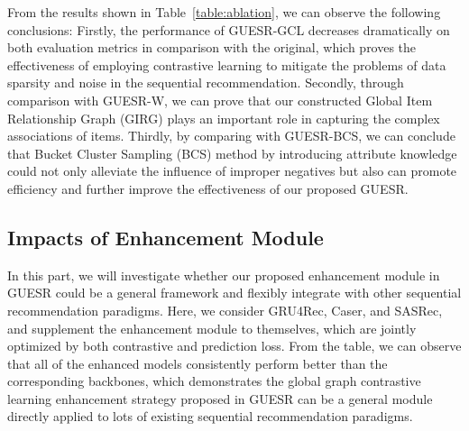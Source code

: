 \documentclass[runningheads]{llncs}
\begin{document}
From the results shown in Table~\ref{table:ablation}, we can observe the following conclusions: 
Firstly, the performance of GUESR-GCL decreases dramatically on both evaluation metrics in comparison with the original, which proves the effectiveness of employing contrastive learning to mitigate the problems of data sparsity and noise in the sequential recommendation.
Secondly, through comparison with GUESR-W, we can prove that our constructed Global Item Relationship Graph (GIRG) plays an important role in capturing the complex associations of items. 
Thirdly, by comparing with GUESR-BCS, we can conclude that Bucket Cluster Sampling (BCS) method by introducing attribute knowledge could not only alleviate the influence of improper negatives but also can promote efficiency and further improve the effectiveness of our proposed GUESR. 

\vspace{-15pt}

\subsection{Impacts of Enhancement Module}
\vspace{-5pt}
In this part, we will investigate whether our proposed enhancement module in GUESR could be a general framework and flexibly integrate with other sequential recommendation paradigms. Here, we consider GRU4Rec, Caser, and SASRec, and supplement the enhancement module to themselves, which are jointly optimized by both contrastive and prediction loss. From the table, we can observe that all of the enhanced models consistently perform better than the corresponding backbones, which demonstrates the global graph contrastive learning enhancement strategy proposed in GUESR can be a general module directly applied to lots of existing sequential recommendation paradigms. 

\vspace{-10pt}
\end{document}
